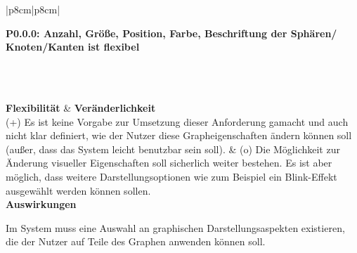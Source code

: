 \documentclass[enabledeprecatedfontcommands,fontsize=11pt,paper=a4,twoside]{scrartcl}
\newcounter{one}
\newcounter{two}[one]
\newcounter{three}[two]
\newcommand{\tone}{0\theone}
\newcommand{\ttwo}{0\thetwo}
\newcommand{\three}{\stepcounter{three}0\thethree}
\newcommand\s{\rule{0pt}{4ex}}
\begin{document}
\begin{tabular} {|p{8cm}|p{8cm}|}
	\hline
	 {\parbox{16cm}{\textbf{\hypertarget{r}{P\tone.\ttwo.\three}: Anzahl, Größe, Position, Farbe, Beschriftung der Sphären/ Knoten/Kanten ist flexibel}} } \s \\ [1ex]  \hline\hline 
	\rule{0pt}{10ex}\\ [3ex] \hline
	\textbf{Flexibilität}  & \textbf{Veränderlichkeit} \\
	(+) Es ist keine Vorgabe zur Umsetzung dieser Anforderung gamacht und auch nicht klar definiert, wie der Nutzer diese Grapheigenschaften ändern können soll (außer, dass das System leicht benutzbar sein soll). &
	(o) Die Möglichkeit zur Änderung visueller Eigenschaften soll sicherlich weiter bestehen. Es ist aber möglich, dass weitere Darstellungsoptionen wie zum Beispiel ein Blink-Effekt ausgewählt werden können sollen. \\ \hline 
	 {\textbf{Auswirkungen}} \\
	 {\parbox{16cm}{Im System muss eine Auswahl an graphischen Darstellungsaspekten existieren, die der Nutzer auf Teile des Graphen anwenden können soll.} }\\ \hline
\end{tabular}
\\ \\ \\ \\%
\end{document}
